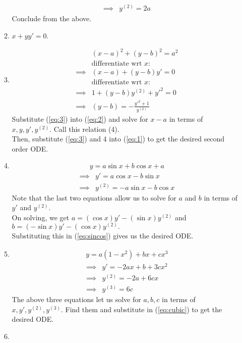 \documentclass{article}
\begin{document}
\begin{enumerate}[label = Q.\arabic*.]
\begin{enumerate}[label = (\roman*)]
\begin{align*}
			\implies & y^{(2)} = 2a
		\end{align*}
		Conclude from the above.
		\item $x + yy' = 0.$
		\item 
		\begin{align} 
			& (x - a)^2 + (y - b)^2 = a^2 \label{eq:1}\\
			&\text{differentiate wrt } x: \nonumber\\
			\implies & (x - a) + (y - b)y' = 0 \label{eq:2}\\
			&\text{differentiate wrt } x: \nonumber\\
			\implies & 1 + (y - b)y^{(2)} + y'^2 = 0 \nonumber\\
			\implies & (y - b) = -\frac{y'^2 + 1}{y^{(2)}} \label{eq:3}
		\end{align}
		Substitute (\ref{eq:3}) into (\ref{eq:2}) and solve for $x - a$ in terms of $x, y, y', y^{(2)}.$ Call this relation (4).\\
		Then, substitute (\ref{eq:3}) and 4 into (\ref{eq:1}) to get the desired second order ODE.
		\item 
		\begin{align} \label{eq:sincos}
			y = a\sin x + b\cos x + a
		\end{align}
		\begin{align*} 
			\implies & y' = a\cos x - b\sin x\\
			\implies & y^{(2)} = -a\sin x - b\cos x
		\end{align*}
		Note that the last two equations allow us to solve for $a$ and $b$ in terms of $y'$ and $y^{(2)}.$\\
		On solving, we get $a = (\cos x)y' - (\sin x)y^{(2)}$ and $b = (-\sin x)y' - (\cos x)y^{(2)}.$\\
		Substituting this in (\ref{eq:sincos}) gives us the desired ODE.
		\item 
		\begin{align} \label{eq:cubic}
			y = a(1 - x^2) + bx + cx^3
		\end{align}
		\begin{align*} 
			\implies & y' = -2ax + b + 3cx^2\\
			\implies & y^{(2)} = -2a + 6cx\\
			\implies & y^{(3)} = 6c
		\end{align*}
		The above three equations let us solve for $a, b, c$ in terms of $x, y', y^{(2)}, y^{(3)}.$ Find them and substitute in (\ref{eq:cubic}) to get the desired ODE.
		\item 

\end{enumerate}
\end{enumerate}
\end{document}
